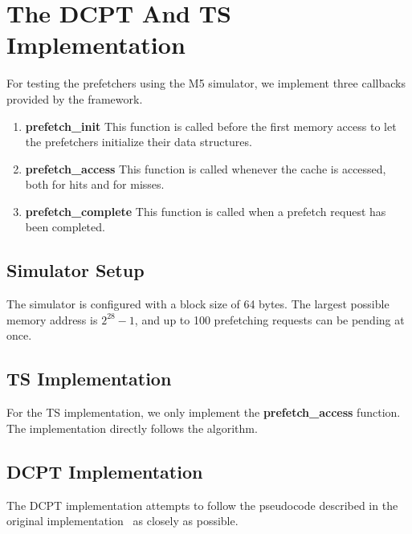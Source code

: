 \section{The DCPT And TS Implementation}

For testing the prefetchers using the M5 simulator, we implement three callbacks
provided by the framework.

\begin{enumerate}
	\item \textbf{prefetch\_init}
		This function is called before the first memory access to let the
		prefetchers initialize their data structures.
	\item \textbf{prefetch\_access}
		This function is called whenever the cache is accessed, both for hits
		and for misses.
	\item \textbf{prefetch\_complete}
		This function is called when a prefetch request has been completed.
\end{enumerate}

\subsection{Simulator Setup}


The simulator is configured with a block size of 64 bytes. The largest possible
memory address is $2^{28}-1$, and up to 100 prefetching requests can be pending
at once.

\subsection{TS Implementation}

For the TS implementation, we only implement the
\textbf{prefetch\_access} function. The implementation directly follows the
algorithm.


\subsection{DCPT Implementation}


The DCPT implementation attempts to follow the pseudocode described in the
original implementation~\cite{dcpt} as closely as possible.

